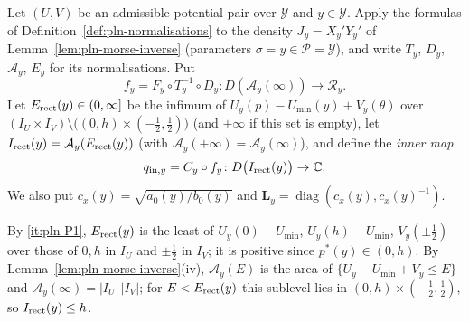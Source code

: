 \begin{definition}\label{def:pln-inner-map}
Let $(U,V)$ be an admissible potential pair over $\mathcal Y$ and $y\in\mathcal Y$. Apply
the formulas of Definition~\ref{def:pln-normalisations} to the density $J_y=X_y'Y_y'$ of Lemma~\ref{lem:pln-morse-inverse}
(parameters $\sigma=y\in\mathcal P=\mathcal Y$), and write $T_y$, $D_y$, $\mathcal A_y$, $E_y$ for its normalisations. Put
\[
 f_y=F_y\circ T_y^{-1}\circ D_y\colon D(\mathcal A_y(\infty))\to\mathcal R_y .
\]
Let $E_{\rm rect}(y)\in(0,\infty]$ be the infimum of $U_y(p)-U_{\min}(y)+V_y(\theta)$ over
$(I_U\times I_V)\setminus\bigl((0,h)\times(-\frac12,\frac12)\bigr)$ (and $+\infty$ if this set is empty), let
$I_{\rm rect}(y)=\mathcal A_y(E_{\rm rect}(y))$ (with $\mathcal A_y(+\infty)=\mathcal A_y(\infty)$), and define the
\emph{inner map}
\[
 q_{{\rm in},y}=C_y\circ f_y\colon D\bigl(I_{\rm rect}(y)\bigr)\to\mathbb{C} .
\]
We also put $c_x(y)=\sqrt{a_0(y)/b_0(y)}$ and $\mathbf L_y=\operatorname{diag}(c_x(y),c_x(y)^{-1})$.
\end{definition}

By \ref{it:pln-P1}, $E_{\rm rect}(y)$ is the least of $U_y(0)-U_{\min}$, $U_y(h)-U_{\min}$, $V_y(\pm\frac12)$ over those of $0,h$ in $I_U$ and $\pm\frac12$ in $I_V$; it is positive since $p^*(y)\in(0,h)$. By Lemma~\ref{lem:pln-morse-inverse}(iv), $\mathcal A_y(E)$ is the area of $\{U_y-U_{\min}+V_y\le E\}$ and $\mathcal A_y(\infty)=|I_U|\,|I_V|$; for $E<E_{\rm rect}(y)$ this sublevel lies in $(0,h)\times(-\frac12,\frac12)$, so $I_{\rm rect}(y)\le h$.

